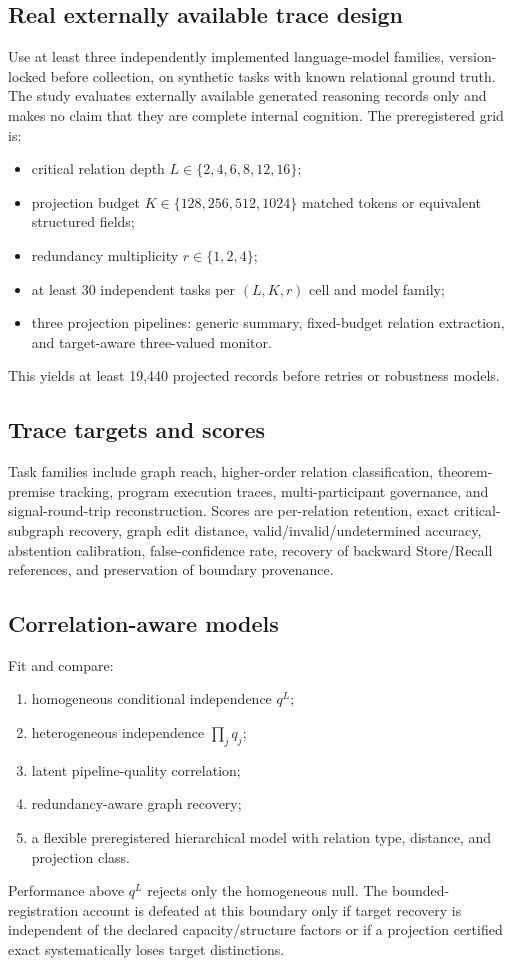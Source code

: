 \documentclass[11pt]{article}
\begin{document}
\subsection{Real externally available trace design}

Use at least three independently implemented language-model families, version-locked before collection, on synthetic tasks with known relational ground truth. The study evaluates externally available generated reasoning records only and makes no claim that they are complete internal cognition. The preregistered grid is:
\begin{itemize}
\item critical relation depth $L\in\{2,4,6,8,12,16\}$;
\item projection budget $K\in\{128,256,512,1024\}$ matched tokens or equivalent structured fields;
\item redundancy multiplicity $r\in\{1,2,4\}$;
\item at least 30 independent tasks per $(L,K,r)$ cell and model family;
\item three projection pipelines: generic summary, fixed-budget relation extraction, and target-aware three-valued monitor.
\end{itemize}
This yields at least 19,440 projected records before retries or robustness models.

\subsection{Trace targets and scores}

Task families include graph reach, higher-order relation classification, theorem-premise tracking, program execution traces, multi-participant governance, and signal-round-trip reconstruction. Scores are per-relation retention, exact critical-subgraph recovery, graph edit distance, valid/invalid/undetermined accuracy, abstention calibration, false-confidence rate, recovery of backward Store/Recall references, and preservation of boundary provenance.

\subsection{Correlation-aware models}

Fit and compare:
\begin{enumerate}
\item homogeneous conditional independence $q^L$;
\item heterogeneous independence $\prod_j q_j$;
\item latent pipeline-quality correlation;
\item redundancy-aware graph recovery;
\item a flexible preregistered hierarchical model with relation type, distance, and projection class.
\end{enumerate}
Performance above $q^L$ rejects only the homogeneous null. The bounded-registration account is defeated at this boundary only if target recovery is independent of the declared capacity/structure factors or if a projection certified exact systematically loses target distinctions.
\end{document}

